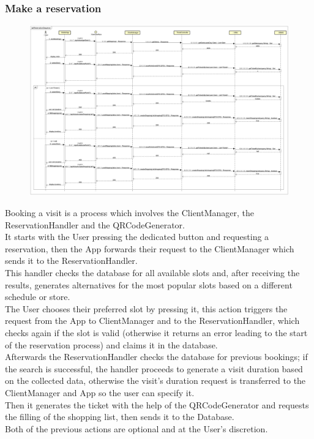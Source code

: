 \documentclass[table, 12pt]{article}
\begin{document}
\subsubsection{Make a reservation}
\begin{figure}[H]
    \begin{center}
        \includegraphics[width=\textwidth]{assets/Sequence-Diagram/ReservationSequence.png}
    \end{center}
\end{figure}
Booking a visit is a process which involves the ClientManager, the ReservationHandler and the QRCodeGenerator.\\
It starts with the User pressing the dedicated button and requesting a reservation, then the App forwards their request to the ClientManager which sends it to the ReservationHandler.\\
This handler checks the database for all available slots and, after receiving the results, generates alternatives for the most popular slots based on a different schedule or store.\\
The User chooses their preferred slot by pressing it, this action triggers the request from the App to ClientManager and to the ReservationHandler, which checks again if the slot is valid (otherwise it returns an error leading to the start of the reservation process) and claims it in the database.\\
Afterwards the ReservationHandler checks the database for previous bookings; if the search is successful, the handler proceeds to generate a visit duration based on the collected data, otherwise the visit's duration request is transferred to the ClientManager and App so the user can specify it.\\
Then it generates the ticket with the help of the QRCodeGenerator and requests the filling of the shopping list, then sends it to the Database.\\
Both of the previous actions are optional and at the User's discretion.
\end{document}
